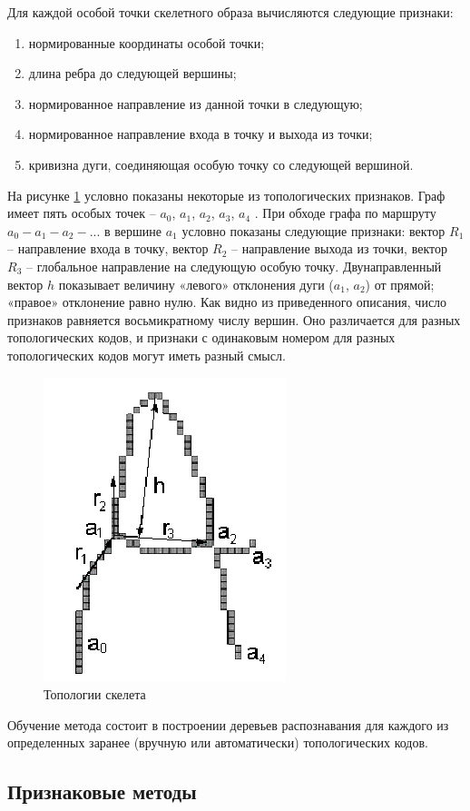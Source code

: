 Для каждой особой точки скелетного образа вычисляются следующие признаки:
\begin{enumerate}
\item нормированные координаты особой точки;
\item длина ребра до следующей вершины;
\item нормированное направление из данной точки в следующую;
\item нормированное направление входа в точку и выхода из точки;
\item кривизна дуги, соединяющая особую точку со следующей вершиной.
\end{enumerate}

На рисунке \ref{img_skelet_2} условно показаны некоторые из топологических признаков. Граф
имеет пять особых точек -- $a_0$, $a_1$, $a_2$, $a_3$, $a_4$ . При обходе графа по маршруту $a_0-a_1-a_2-...$ в вершине $a_1$ условно показаны следующие признаки: вектор $R_1$ -- направление входа в точку, вектор $R_2$ -- направление выхода из точки, вектор $R_3$ -- глобальное направление
на следующую особую точку. Двунаправленный вектор $h$ показывает величину
«левого» отклонения дуги ($a_1$, $a_2$) от прямой; «правое» отклонение равно нулю.
Как видно из приведенного описания, число признаков равняется
восьмикратному числу вершин. Оно различается для разных топологических кодов, и
признаки с одинаковым номером для разных топологических кодов могут иметь
разный смысл.

\begin{figure}[h]
\centering
\includegraphics[width=0.25\linewidth,keepaspectratio]{images/intro_skelet_2}
\caption{Топологии скелета}
\label{img_skelet_2}
\end{figure}

Обучение метода состоит в построении деревьев распознавания для каждого из
определенных заранее (вручную или автоматически) топологических кодов.

\subsection{Признаковые методы}

